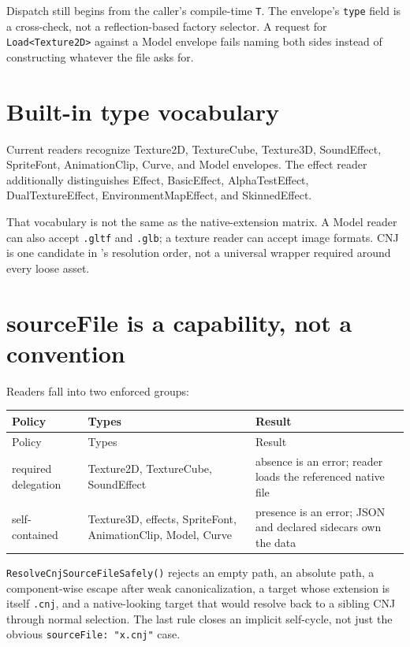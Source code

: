 Dispatch still begins from the caller's compile-time \texttt{T}.  The envelope's \texttt{type}
field is a cross-check, not a reflection-based factory selector.  A request for
\texttt{Load<Texture2D>} against a Model envelope fails naming both sides instead of constructing
whatever the file asks for.

\section{Built-in type vocabulary}

Current readers recognize Texture2D, TextureCube, Texture3D, SoundEffect, SpriteFont,
AnimationClip, Curve, and Model envelopes.  The effect reader additionally distinguishes Effect,
BasicEffect, AlphaTestEffect, DualTextureEffect, EnvironmentMapEffect, and SkinnedEffect.

That vocabulary is not the same as the native-extension matrix.  A Model reader can also accept
\texttt{.gltf} and \texttt{.glb}; a texture reader can accept image formats.  CNJ is one candidate
in 's resolution order, not a universal wrapper required around every
loose asset.

\section{sourceFile is a capability, not a convention}

Readers fall into two enforced groups:

\begin{longtable}{p{}p{}p{}}
\toprule
Policy & Types & Result \\
\midrule
\endfirsthead
\toprule
Policy & Types & Result \\
\midrule
\endhead
required delegation & Texture2D, TextureCube, SoundEffect & absence is an error; reader loads the referenced native file \\
self-contained & Texture3D, effects, SpriteFont, AnimationClip, Model, Curve & presence is an error; JSON and declared sidecars own the data \\
\bottomrule
\end{longtable}

\texttt{ResolveCnjSourceFileSafely()} rejects an empty path, an absolute path, a component-wise
escape after weak canonicalization, a target whose extension is itself \texttt{.cnj}, and a
native-looking target that would resolve back to a sibling CNJ through normal selection.  The
last rule closes an implicit self-cycle, not just the obvious \texttt{sourceFile: "x.cnj"} case.

